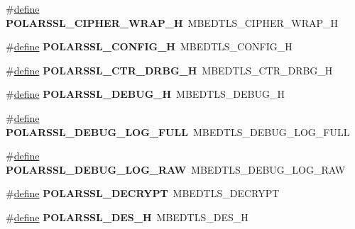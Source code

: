 \begin{DoxyCompactItemize}
\item 
\mbox{\label{compat-1_83_8h_a1e0fbea31404a7e8bb06f4c07aa1c3c6}} 
\#\hyperlink{structdefine}{define} {\bfseries P\+O\+L\+A\+R\+S\+S\+L\+\_\+\+C\+I\+P\+H\+E\+R\+\_\+\+W\+R\+A\+P\+\_\+H}~M\+B\+E\+D\+T\+L\+S\+\_\+\+C\+I\+P\+H\+E\+R\+\_\+\+W\+R\+A\+P\+\_\+H
\item 
\mbox{\label{compat-1_83_8h_a9d9767c04599826f9dae8bab50dce333}} 
\#\hyperlink{structdefine}{define} {\bfseries P\+O\+L\+A\+R\+S\+S\+L\+\_\+\+C\+O\+N\+F\+I\+G\+\_\+H}~M\+B\+E\+D\+T\+L\+S\+\_\+\+C\+O\+N\+F\+I\+G\+\_\+H
\item 
\mbox{\label{compat-1_83_8h_a34c44b95102db90eb5e5e81f63692e0a}} 
\#\hyperlink{structdefine}{define} {\bfseries P\+O\+L\+A\+R\+S\+S\+L\+\_\+\+C\+T\+R\+\_\+\+D\+R\+B\+G\+\_\+H}~M\+B\+E\+D\+T\+L\+S\+\_\+\+C\+T\+R\+\_\+\+D\+R\+B\+G\+\_\+H
\item 
\mbox{\label{compat-1_83_8h_a25506952a265c23e7c0675498d3f464f}} 
\#\hyperlink{structdefine}{define} {\bfseries P\+O\+L\+A\+R\+S\+S\+L\+\_\+\+D\+E\+B\+U\+G\+\_\+H}~M\+B\+E\+D\+T\+L\+S\+\_\+\+D\+E\+B\+U\+G\+\_\+H
\item 
\mbox{\label{compat-1_83_8h_a22b4e84bee2331a8619361e89e88f32d}} 
\#\hyperlink{structdefine}{define} {\bfseries P\+O\+L\+A\+R\+S\+S\+L\+\_\+\+D\+E\+B\+U\+G\+\_\+\+L\+O\+G\+\_\+\+F\+U\+LL}~M\+B\+E\+D\+T\+L\+S\+\_\+\+D\+E\+B\+U\+G\+\_\+\+L\+O\+G\+\_\+\+F\+U\+LL
\item 
\mbox{\label{compat-1_83_8h_af79a062d27a8387a9b1cd98e72f9d35e}} 
\#\hyperlink{structdefine}{define} {\bfseries P\+O\+L\+A\+R\+S\+S\+L\+\_\+\+D\+E\+B\+U\+G\+\_\+\+L\+O\+G\+\_\+\+R\+AW}~M\+B\+E\+D\+T\+L\+S\+\_\+\+D\+E\+B\+U\+G\+\_\+\+L\+O\+G\+\_\+\+R\+AW
\item 
\mbox{\label{compat-1_83_8h_a534f1e964e942820da090be4dc9bdb79}} 
\#\hyperlink{structdefine}{define} {\bfseries P\+O\+L\+A\+R\+S\+S\+L\+\_\+\+D\+E\+C\+R\+Y\+PT}~M\+B\+E\+D\+T\+L\+S\+\_\+\+D\+E\+C\+R\+Y\+PT
\item 
\mbox{\label{compat-1_83_8h_a4814f3a1e70b852a32b9a06e50cfcdea}} 
\#\hyperlink{structdefine}{define} {\bfseries P\+O\+L\+A\+R\+S\+S\+L\+\_\+\+D\+E\+S\+\_\+H}~M\+B\+E\+D\+T\+L\+S\+\_\+\+D\+E\+S\+\_\+H

\end{DoxyCompactItemize}
